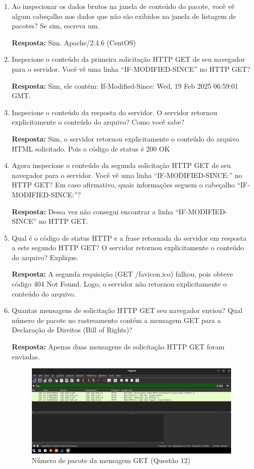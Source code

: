 \documentclass[12pt,a4paper]{report}
\begin{document}
\begin{enumerate}
		\item Ao inspecionar os dados brutos na janela de conteúdo do pacote, você vê algum cabeçalho nos dados que não são exibidos na janela de listagem de pacotes? Se sim, escreva um.

		\textbf{Resposta:} Sim. Apache/2.4.6 (CentOS)

		\item Inspecione o conteúdo da primeira solicitação HTTP GET de seu navegador para o servidor. Você vê uma linha “IF-MODIFIED-SINCE” no HTTP GET?

		\textbf{Resposta:} Sim, ele contém: If-Modified-Since: Wed, 19 Feb 2025 06:59:01 GMT.

		\item Inspecione o conteúdo da resposta do servidor. O servidor retornou explicitamente o conteúdo do arquivo? Como você sabe?

		\textbf{Resposta:} Sim, o servidor retornou explicitamente o conteúdo do arquivo HTML solicitado. Pois o código de status é 200 OK

		\item Agora inspecione o conteúdo da segunda solicitação HTTP GET de seu navegador para o servidor. Você vê uma linha “IF-MODIFIED-SINCE:” no HTTP GET? Em caso afirmativo, quais informações seguem o cabeçalho “IF-MODIFIED-SINCE:”?

		\textbf{Resposta:} Dessa vez não consegui encontrar a linha “IF-MODIFIED-SINCE” no HTTP GET.

		\item Qual é o código de status HTTP e a frase retornada do servidor em resposta a este segundo HTTP GET? O servidor retornou explicitamente o conteúdo do arquivo? Explique.

		\textbf{Resposta:} A segunda requisição (GET /favicon.ico) falhou, pois obteve código 404 Not Found. Logo, o servidor não retornou explicitamente o conteúdo do arquivo.

		\item Quantas mensagens de solicitação HTTP GET seu navegador enviou? Qual número de pacote no rastreamento contém a mensagem GET para a Declaração de Direitos (Bill of Rights)?

		\textbf{Resposta:} Apenas duas mensagens de solicitação HTTP GET foram enviadas.

		\begin{figure}[H]
			\centering
			\includegraphics[width=1\textwidth]{q12.png}
			\caption{Número de pacote da mensagem GET (Questão 12)}
			\label{fig:numeroPacoteGET}
		\end{figure}


\end{enumerate}
\end{document}
